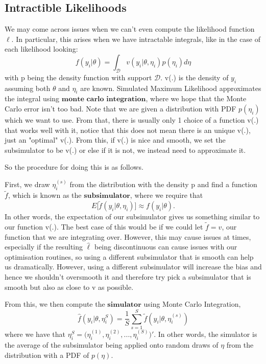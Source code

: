 \documentclass[twoside]{article}
\begin{document}
\subsection{Intractible Likelihoods}
We may come across issues when we can't even compute the likelihood function $\ell$. In particular, this arises when we have intractable integrals, like in the case of each likelihood looking:
$$
f(y_i|\theta) = \int_{\mathcal{D}}v(y_i|\theta,\eta_i)p(\eta_i)d\eta
$$
with p being the density function with support $\mathcal{D}$. v(.) is the density of $y_i$ assuming both $\theta$ and $\eta_i$ are known. Simulated Maximum Likelihood approximates the integral using $\textbf{monte carlo integration}$, where we hope that the Monte Carlo error isn't too bad. Note that we are given a distribution with PDF $p(\eta_i)$ which we want to use. From that, there is usually only 1 choice of a function v(.) that works well with it, notice that this does not mean there is an unique v(.), just an "optimal" v(.). From this, if v(.) is nice and smooth, we set the subsimulator to be v(.) or else if it is not, we instead need to approximate it.

So the procedure for doing this is as follows. 
\bigskip

First, we draw $\eta_i^{(s)}$ from the distribution with the density p and find a function $\tilde{f}$, which is known as the $\textbf{subsimulator}$, where we require that
$$
E\big[\tilde{f}(y_i|\theta,\eta_i)\big] \approx f(y_i|\theta).
$$
In other words, the expectation of our subsimulator gives us something similar to our function v(.). The best case of this would be if we could let $\tilde{f} = v$, our function that we are integrating over. However, this may cause issues at times, especially if the resulting $\hat{\ell}$ being discontinuous can cause issues with our optimisation routines, so using a different subsimulator that is smooth can help us dramatically. However, using a different subsimulator will increase the bias and hence we shouldn't oversmooth it and therefore try pick a subsimulator that is smooth but also as close to v as possible.

From this, we then compute the $\textbf{simulator}$ using Monte Carlo Integration, 
$$
\hat{f}(y_i|\theta,\eta_i^S) = \frac{1}{S}\sum_{s=1}^S\tilde{f}(y_i|\theta, \eta_i^{(s)})
$$
where we have that $\eta_i^{S} = \big(\eta_i^{(1)},\eta_i^{(2)},...,\eta_i^{(S)}\big)'$.  In other words, the simulator is the average of the subsimulator being applied onto random draws of $\eta$ from the distribution with a PDF of $p(\eta)$.
\end{document}
